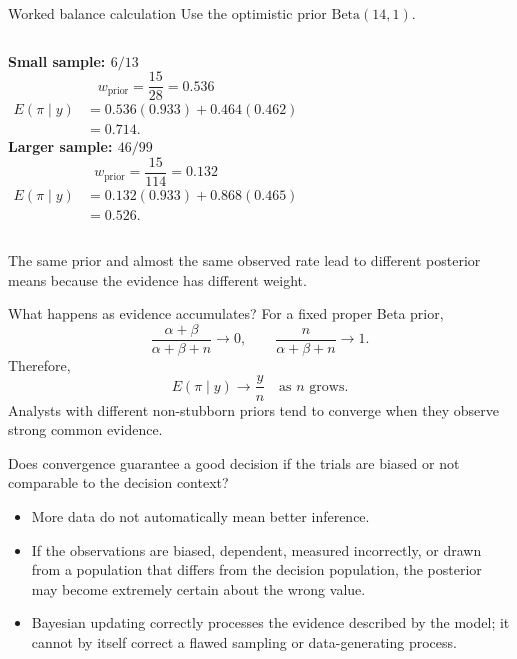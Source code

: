 \documentclass[aspectratio=43,11pt]{beamer}
\begin{document}
\begin{frame}{Worked balance calculation}
Use the optimistic prior $\mathrm{Beta}(14,1)$.
\begin{columns}[T]
\textbf{Small sample: $6/13$}
\[
w_{\text{prior}}=\frac{15}{28}=0.536
\]
\footnotesize
\[
\begin{aligned}
E(\pi\mid y)
  &= 0.536(0.933)+0.464(0.462) \\
  &= 0.714.
\end{aligned}
\]
\textbf{Larger sample: $46/99$}
\[
w_{\text{prior}}=\frac{15}{114}=0.132
\]
\footnotesize
\[
\begin{aligned}
E(\pi\mid y)
  &= 0.132(0.933)+0.868(0.465) \\
  &= 0.526.
\end{aligned}
\]
\end{columns}
\vspace{.7em}
The same prior and almost the same observed rate lead to different posterior means because the evidence has different weight.
\end{frame}

\begin{frame}{What happens as evidence accumulates?}
For a fixed proper Beta prior,
\[
\frac{\alpha+\beta}{\alpha+\beta+n}\longrightarrow 0,
\qquad
\frac{n}{\alpha+\beta+n}\longrightarrow 1.
\]
Therefore,
\[
E(\pi\mid y)\longrightarrow \frac{y}{n}
\quad\text{as }n\text{ grows}.
\]
Analysts with different non-stubborn priors tend to converge when they observe strong common evidence.

Does convergence guarantee a good decision if the trials are biased or not comparable to the decision context?
\end{frame}

\begin{frame}
\begin{itemize}
\item More data do not automatically mean better inference.
\item If the observations are biased, dependent, measured incorrectly, or drawn from a population that differs from the decision population, the posterior may become extremely certain about the wrong value.
\item Bayesian updating correctly processes the evidence described by the model; it cannot by itself correct a flawed sampling or data-generating process.
\end{itemize}
\end{frame}
\end{document}
